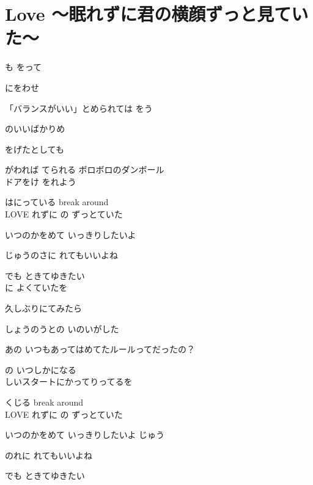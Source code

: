 \section{ Love ～眠れずに君の横顔ずっと見ていた～}
\large{

も  をって

にをわせ

「バランスがいい」とめられては  をう

のいいばかりめ

をげたとしても

がわれば  てられる  ボロボロのダンボール
\\

ドアをけ  をれよう

はにっている  break around
\\

LOVE  れずに  の  ずっとていた

いつのかをめて  いっきりしたいよ 

 じゅうのさに  れてもいいよね

でも  ときてゆきたい
\\

に  よくていたを

久しぶりにてみたら

しょうのうとの  いのいがした

あの  いつもあってはめてたルールってだったの？

の  いつしかになる
\\

しいスタートにかってりってるを

くじる  break around
\\

LOVE  れずに  の  ずっとていた

いつのかをめて  いっきりしたいよ  じゅう

のれに  れてもいいよね

でも  ときてゆきたい

}